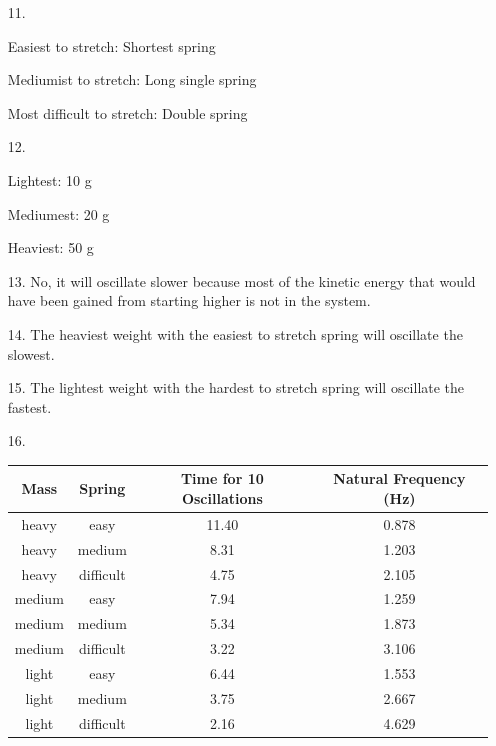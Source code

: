     \begin{itemize}
        \item [11.]
        
        Easiest to stretch: Shortest spring

        Mediumist to stretch: Long single spring

        Most difficult to stretch: Double spring

        \item [12.]
        
        Lightest: 10 g

        Mediumest: 20 g

        Heaviest: 50 g

        \item [13.] No, it will oscillate slower because most of the kinetic energy that would have been gained from starting higher is not in the system.
        \item [14.] The heaviest weight with the easiest to stretch spring will oscillate the slowest.
        \item [15.] The lightest weight with the hardest to stretch spring will oscillate the fastest.
        \item [16.] \mbox{}\\
        
        \begin{center}
            \begin{tabular}{c | c | c | c}
                Mass & Spring & Time for 10 Oscillations & Natural Frequency (Hz) \\
                \hline
                heavy & easy & 11.40 & 0.878    \\
                heavy & medium & 8.31 & 1.203   \\
                heavy & difficult & 4.75 & 2.105\\
                medium & easy & 7.94 & 1.259    \\
                medium & medium & 5.34 & 1.873  \\
                medium & difficult & 3.22 & 3.106\\
                light & easy & 6.44 & 1.553     \\
                light & medium & 3.75 & 2.667   \\
                light & difficult & 2.16 & 4.629\\
            \end{tabular}
        \end{center}


\end{itemize}

